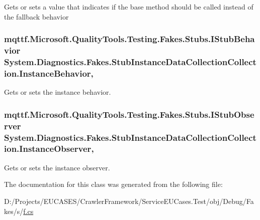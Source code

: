 Gets or sets a value that indicates if the base method should be called instead of the fallback behavior

\hypertarget{class_system_1_1_diagnostics_1_1_fakes_1_1_stub_instance_data_collection_collection_a0b38779c2b3afe26887773dc2e02f00e}{
\subsubsection[{Instance\-Behavior}]{\setlength{\rightskip}{0pt plus 5cm}mqttf.\-Microsoft.\-Quality\-Tools.\-Testing.\-Fakes.\-Stubs.\-I\-Stub\-Behavior System.\-Diagnostics.\-Fakes.\-Stub\-Instance\-Data\-Collection\-Collection.\-Instance\-Behavior\hspace{0.3cm}{\ttfamily [get]}, {\ttfamily [set]}}}\label{class_system_1_1_diagnostics_1_1_fakes_1_1_stub_instance_data_collection_collection_a0b38779c2b3afe26887773dc2e02f00e}


Gets or sets the instance behavior.

\hypertarget{class_system_1_1_diagnostics_1_1_fakes_1_1_stub_instance_data_collection_collection_a3728e2ae992e6e564574477385fe1fcb}{
\subsubsection[{Instance\-Observer}]{\setlength{\rightskip}{0pt plus 5cm}mqttf.\-Microsoft.\-Quality\-Tools.\-Testing.\-Fakes.\-Stubs.\-I\-Stub\-Observer System.\-Diagnostics.\-Fakes.\-Stub\-Instance\-Data\-Collection\-Collection.\-Instance\-Observer\hspace{0.3cm}{\ttfamily [get]}, {\ttfamily [set]}}}\label{class_system_1_1_diagnostics_1_1_fakes_1_1_stub_instance_data_collection_collection_a3728e2ae992e6e564574477385fe1fcb}


Gets or sets the instance observer.



The documentation for this class was generated from the following file\-:\begin{DoxyCompactItemize}
\item 
D\-:/\-Projects/\-E\-U\-C\-A\-S\-E\-S/\-Crawler\-Framework/\-Service\-E\-U\-Cases.\-Test/obj/\-Debug/\-Fakes/s/\hyperlink{s_2f_8cs}{f.\-cs}\end{DoxyCompactItemize}
